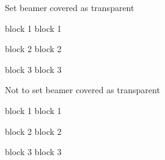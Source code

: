 \documentclass{beamer}
\begin{document}
{
\begin{frame}{Set beamer covered as transparent}
\begin{block}{block 1}
  block 1
\end{block}\pause
\begin{block}{block 2}
  block 2
\end{block}\pause
\begin{block}{block 3}
  block 3
\end{block}
\end{frame}
}
\begin{frame}{Not to set beamer covered as transparent}
\begin{block}{block 1}
  block 1
\end{block}\pause
\begin{block}{block 2}
  block 2
\end{block}\pause
\begin{block}{block 3}
  block 3
\end{block}
\end{frame}
\end{document}
